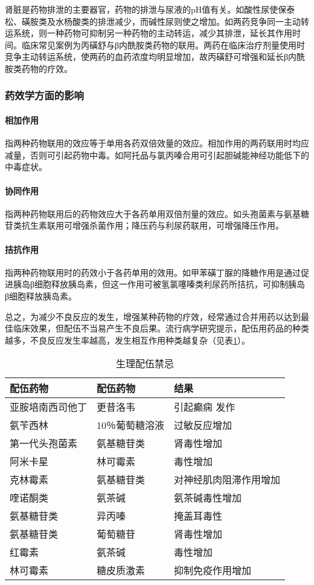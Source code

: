 肾脏是药物排泄的主要器官，药物的排泄与尿液的pH值有关。如酸性尿使保泰松、磺胺类及水杨酸类的排泄减少，而碱性尿则使之增加。如两药竞争同一主动转运系统，则一种药物可抑制另一种药物的主动转运，减少其排泄，延长其作用时间。临床常见案例为丙磺舒与β内酰胺类药物的联用。两药在临床治疗剂量使用时竞争主动转运系统，使两药的血药浓度均明显增加，故丙磺舒可增强和延长β内酰胺类药物的疗效。

\subsubsection{药效学方面的影响}
\paragraph{相加作用}

指两种药物联用的效应等于单用各药双倍效量的效应。相加作用的两药联用时均应减量，否则可引起药物中毒。如阿托品与氯丙嗪合用可引起胆碱能神经功能低下的中毒症状。
\paragraph{协同作用}

指两种药物联用后的药物效应大于各药单用双倍剂量的效应。如头孢菌素与氨基糖苷类抗生素联用可增强杀菌作用；降压药与利尿药联用，可增强降压作用。
\paragraph{拮抗作用}

指两种药物联用时的药效小于各药单用的效用。如甲苯磺丁脲的降糖作用是通过促进胰岛β细胞释放胰岛素，但这一作用可被氢氯噻嗪类利尿药所拮抗，可抑制胰岛β细胞释放胰岛素。

总之，为减少不良反应的发生，增强某种药物的疗效，经常通过合并用药以达到最佳临床效果，但配伍不当易产生不良后果。流行病学研究提示，配伍用药品的种类越多，不良反应发生率越高，发生相互作用种类越复杂（见表\ref{tab8-3}）。

\begin{longtable}[]{@{}lll@{}}
    \caption{生理配伍禁忌}
    \label{tab8-3}\\
\toprule
\endhead
配伍药物 & 配伍药物 & 结果\tabularnewline
\midrule
亚胺培南西司他丁 & 更昔洛韦 &
引起癫痫 发作\tabularnewline
氨苄西林 & 10％葡萄糖溶液 & 过敏反应增加\tabularnewline
第一代头孢菌素 & 氨基糖苷类 & 肾毒性增加\tabularnewline
阿米卡星 & 林可霉素 & 毒性增加\tabularnewline
克林霉素 & 氨基糖苷类 & 对神经肌肉阻滞作用增加\tabularnewline
喹诺酮类 & 氨茶碱 & 氨茶碱毒性增加\tabularnewline
氨基糖苷类 & 异丙嗪 & 掩盖耳毒性\tabularnewline
氨基糖苷类 & 葡萄糖苷 & 肾毒性增加\tabularnewline
红霉素 & 氨茶碱 & 毒性增加\tabularnewline
林可霉素 & 糖皮质激素 & 抑制免疫作用增加\tabularnewline
\bottomrule
\end{longtable}

